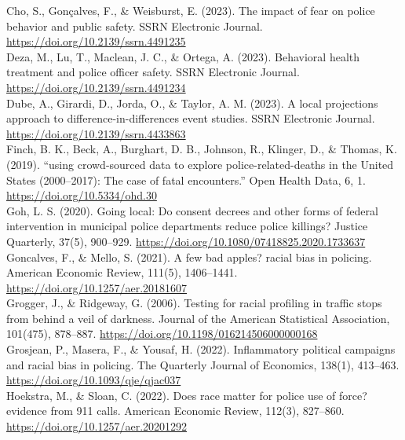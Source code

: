 \documentclass[12pt,a4paper]{article}
\begin{document}
Cho, S., Gonçalves, F., \& Weisburst, E. (2023). The impact of fear on police behavior and public safety. SSRN Electronic Journal. \url{https://doi.org/10.2139/ssrn.4491235} \\

Deza, M., Lu, T., Maclean, J. C., \& Ortega, A. (2023). Behavioral health treatment and police officer safety. SSRN Electronic Journal. \url{https://doi.org/10.2139/ssrn.4491234} \\

Dube, A., Girardi, D., Jorda, O., \& Taylor, A. M. (2023). A local projections approach to difference-in-differences event studies. SSRN Electronic Journal. \url{https://doi.org/10.2139/ssrn.4433863} \\

Finch, B. K., Beck, A., Burghart, D. B., Johnson, R., Klinger, D., \& Thomas, K. (2019). “using crowd-sourced data to explore police-related-deaths in the United States (2000–2017): The case of fatal encounters.” Open Health Data, 6, 1. \url{https://doi.org/10.5334/ohd.30} \\

Goh, L. S. (2020). Going local: Do consent decrees and other forms of federal intervention in municipal police departments reduce police killings? Justice Quarterly, 37(5), 900–929. \url{https://doi.org/10.1080/07418825.2020.1733637} \\

Goncalves, F., \& Mello, S. (2021). A few bad apples? racial bias in policing. American Economic Review, 111(5), 1406–1441. \url{https://doi.org/10.1257/aer.20181607} \\

Grogger, J., \& Ridgeway, G. (2006). Testing for racial profiling in traffic stops from behind a veil of darkness. Journal of the American Statistical Association, 101(475), 878–887. \url{https://doi.org/10.1198/016214506000000168} \\

Grosjean, P., Masera, F., \& Yousaf, H. (2022). Inflammatory political campaigns and racial bias in policing. The Quarterly Journal of Economics, 138(1), 413–463. \url{https://doi.org/10.1093/qje/qjac037} \\

Hoekstra, M., \& Sloan, C. (2022). Does race matter for police use of force? evidence from 911 calls. American Economic Review, 112(3), 827–860. \url{https://doi.org/10.1257/aer.20201292} \\
\end{document}
